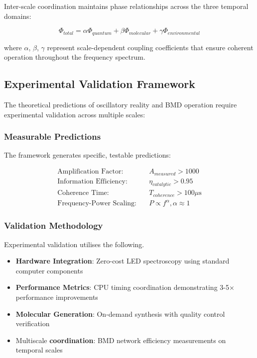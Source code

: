 \documentclass[12pt,a4paper]{article}
\begin{document}
Inter-scale coordination maintains phase relationships across the three temporal domains:

\begin{equation}
\Phi_{total} = \alpha \Phi_{quantum} + \beta \Phi_{molecular} + \gamma \Phi_{environmental}
\end{equation}

where $\alpha$, $\beta$, $\gamma$ represent scale-dependent coupling coefficients that ensure coherent operation throughout the frequency spectrum.

\subsection{Experimental Validation Framework}

The theoretical predictions of oscillatory reality and BMD operation require experimental validation across multiple scales:

\subsubsection{Measurable Predictions}

The framework generates specific, testable predictions:

\begin{align}
\text{Amplification Factor}: \quad &A_{measured} > 1000 \\
\text{Information Efficiency}: \quad &\eta_{catalytic} > 0.95 \\
\text{Coherence Time}: \quad &T_{coherence} > 100 \mu\text{s} \\
\text{Frequency-Power Scaling}: \quad &P \propto f^{\alpha}, \alpha \approx 1
\end{align}

\subsubsection{Validation Methodology}

Experimental validation utilises the following.
\begin{itemize}
\item \textbf{Hardware Integration}: Zero-cost LED spectroscopy using standard computer components
\item \textbf{Performance Metrics}: CPU timing coordination demonstrating 3-5× performance improvements
\item \textbf{Molecular Generation}: On-demand synthesis with quality control verification 
\item Multiscale \textbf{coordination}: BMD network efficiency measurements on temporal scales \cite{vedral2011living}
\end{itemize}
\end{document}
